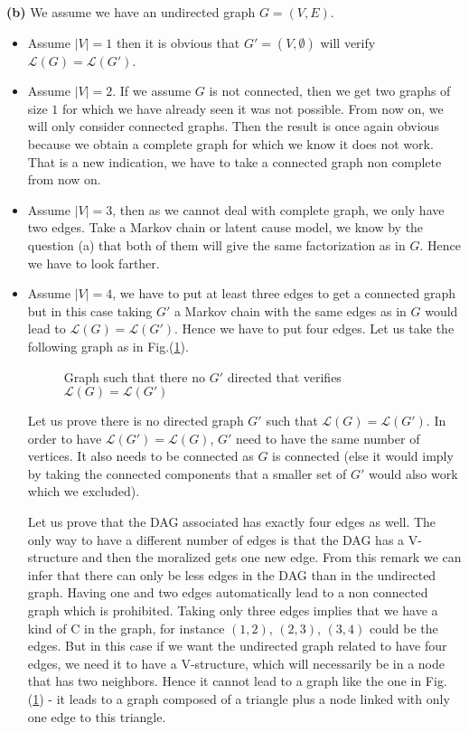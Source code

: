 \documentclass[10pt]{article}
\begin{document}
\textbf{(b)} We assume we have an undirected graph $G = (V,E)$.
\begin{itemize}
\item Assume $|V| = 1$ then it is obvious that $G' = (V,\emptyset)$ will verify $\mathcal{L}(G) = \mathcal{L}(G')$.

\item Assume $|V| = 2$. If we assume $G$ is not connected, then we get two graphs of size $1$ for which we have already seen it was not possible. From now on, we will only consider connected graphs. Then the result is once again obvious because we obtain a complete graph for which we know it does not work. That is a new indication, we have to take a connected graph non complete from now on. 

\item Assume $|V| = 3$, then as we cannot deal with complete graph, we only have two edges. Take a Markov chain or latent cause model, we know by the question (a) that both of them will give the same factorization as in $G$. Hence we have to look farther.

\item Assume $|V| = 4$, we have to put at least three edges to get a connected graph but in this case taking $G'$ a Markov chain with the same edges as in $G$ would lead to $\mathcal{L}(G) = \mathcal{L}(G')$. Hence we have to put four edges. Let us take the following graph as in Fig.(\ref{fig4}).
\begin{figure}[h!]
\centering
{}
\caption{Graph such that there no $G'$ directed that verifies $\mathcal{L}(G) = \mathcal{L}(G')$}
\label{fig4}
\end{figure}

Let us prove there is no directed graph $G'$ such that $\mathcal{L}(G) = \mathcal{L}(G')$. In order to have $\mathcal{L}(G') = \mathcal{L}(G)$, $G'$ need to have the same number of vertices. It also needs to be connected as $G$ is connected (else it would imply by taking the connected components that a smaller set of $G'$ would also work which we excluded). 

Let us prove that the DAG associated has exactly four edges as well. The only way to have a different number of edges is that the DAG has a V-structure and then the moralized gets one new edge. From this remark we can infer that there can only be less edges in the DAG than in the undirected graph. Having one and two edges automatically lead to a non connected graph which is prohibited. Taking only three edges implies that we have a kind of C in the graph, for instance $(1,2)$, $(2,3)$, $(3,4)$ could be the edges. But in this case if we want the undirected graph related to have four edges, we need it to have a V-structure, which will necessarily be in a node that has two neighbors. Hence it cannot lead to a graph like the one in Fig.(\ref{fig4}) - it leads to a graph composed of a triangle plus a node linked with only one edge to this triangle.


\end{itemize}
\end{document}
